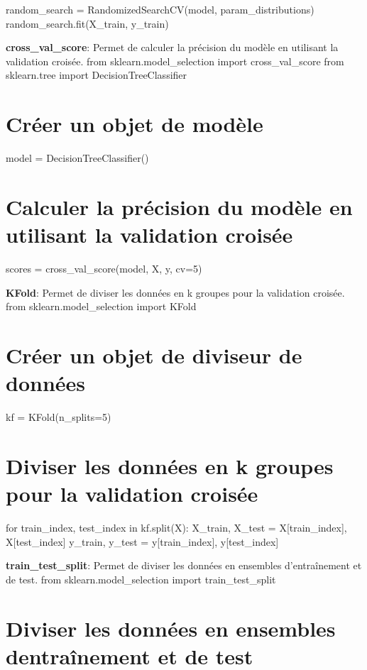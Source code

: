 random\+\_\+search = Randomized\+Search\+C\+V(model, param\+\_\+distributions) random\+\_\+search.\+fit(\+X\+\_\+train, y\+\_\+train)


\begin{DoxyEnumerate}
\item {\bfseries cross\+\_\+val\+\_\+score}\+: Permet de calculer la précision du modèle en utilisant la validation croisée. from sklearn.\+model\+\_\+selection import cross\+\_\+val\+\_\+score from sklearn.\+tree import Decision\+Tree\+Classifier \section*{Créer un objet de modèle}
\end{DoxyEnumerate}

model = Decision\+Tree\+Classifier() \section*{Calculer la précision du modèle en utilisant la validation croisée}

scores = cross\+\_\+val\+\_\+score(model, X, y, cv=5)


\begin{DoxyEnumerate}
\item {\bfseries K\+Fold}\+: Permet de diviser les données en k groupes pour la validation croisée. from sklearn.\+model\+\_\+selection import K\+Fold \section*{Créer un objet de diviseur de données}
\end{DoxyEnumerate}

kf = K\+Fold(n\+\_\+splits=5) \section*{Diviser les données en k groupes pour la validation croisée}

for train\+\_\+index, test\+\_\+index in kf.\+split(\+X)\+: X\+\_\+train, X\+\_\+test = X\mbox{[}train\+\_\+index\mbox{]}, X\mbox{[}test\+\_\+index\mbox{]} y\+\_\+train, y\+\_\+test = y\mbox{[}train\+\_\+index\mbox{]}, y\mbox{[}test\+\_\+index\mbox{]}


\begin{DoxyEnumerate}
\item {\bfseries train\+\_\+test\+\_\+split}\+: Permet de diviser les données en ensembles d’entraînement et de test. from sklearn.\+model\+\_\+selection import train\+\_\+test\+\_\+split \section*{Diviser les données en ensembles d\textquotesingle{}entraînement et de test}
\end{DoxyEnumerate}

